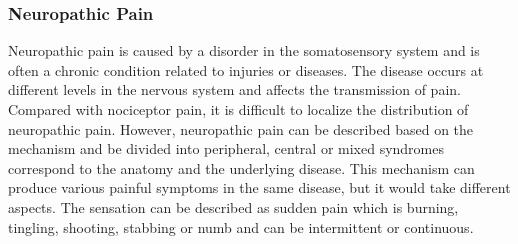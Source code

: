\subsubsection{Neuropathic Pain}
Neuropathic pain is caused by a disorder in the somatosensory system and is often a chronic condition related to injuries or diseases. The disease occurs at different levels in the nervous system and affects the transmission of pain. Compared with nociceptor pain, it is difficult to localize the distribution of neuropathic pain. However, neuropathic pain can be described based on the mechanism and be divided into peripheral, central or mixed syndromes correspond to the anatomy and the underlying disease. This mechanism can produce various painful symptoms in the same disease, but it would take different aspects. The sensation can be described as sudden pain which is burning, tingling, shooting, stabbing or numb and can be intermittent or continuous. \cite{Mindruta2013}



